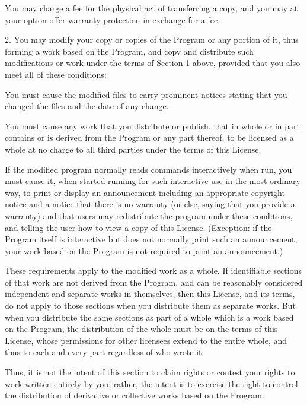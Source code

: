 \item{} You may charge a fee for the physical act of transferring a
copy, and you may at your option offer warranty protection in exchange
for a fee.

\item{2.} You may modify your copy or copies of the Program or any
portion of it, thus forming a work based on the Program, and copy and
distribute such modifications or work under the terms of Section 1
above, provided that you also meet all of these conditions:

 You must cause the modified files to carry prominent
    notices stating that you changed the files and the date of any
    change.

 You must cause any work that you distribute or publish,
    that in whole or in part contains or is derived from the Program or
    any part thereof, to be licensed as a whole at no charge to all
    third parties under the terms of this License.

 If the modified program normally reads commands
    interactively when run, you must cause it, when started running for
    such interactive use in the most ordinary way, to print or display
    an announcement including an appropriate copyright notice and a
    notice that there is no warranty (or else, saying that you provide a
    warranty) and that users may redistribute the program under these
    conditions, and telling the user how to view a copy of this License.
    (Exception: if the Program itself is interactive but does not
    normally print such an announcement, your work based on the Program
    is not required to print an announcement.)

\item{}These requirements apply to the modified work as a whole.  If
identifiable sections of that work are not derived from the Program, and
can be reasonably considered independent and separate works in
themselves, then this License, and its terms, do not apply to those
sections when you distribute them as separate works.  But when you
distribute the same sections as part of a whole which is a work based on
the Program, the distribution of the whole must be on the terms of this
License, whose permissions for other licensees extend to the entire
whole, and thus to each and every part regardless of who wrote it.

\item{}Thus, it is not the intent of this section to claim rights or
contest your rights to work written entirely by you; rather, the intent
is to exercise the right to control the distribution of derivative or
collective works based on the Program.

